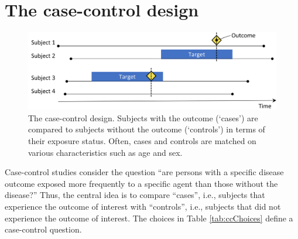 \documentclass[11pt]{book}
\theoremstyle{definition}
\theoremstyle{definition}
\theoremstyle{definition}
\theoremstyle{remark}
\begin{document}
\hypertarget{the-case-control-design}{%
\section{The case-control design}\label{the-case-control-design}}

\begin{figure}

{\centering \includegraphics[width=0.9\linewidth]{images/PopulationLevelEstimation/caseControl} 

}

\caption{The case-control design. Subjects with the outcome (‘cases’) are compared to subjects without the outcome (‘controls’) in terms of their exposure status. Often, cases and controls are matched on various characteristics such as age and sex.}\label{fig:caseControl}
\end{figure}

Case-control studies \citep{vandenbroucke_2012} consider the question ``are persons with a specific disease outcome exposed more frequently to a specific agent than those without the disease?'' Thus, the central idea is to compare ``cases'', i.e., subjects that experience the outcome of interest with ``controls'', i.e., subjects that did not experience the outcome of interest. The choices in Table \ref{tab:ccChoices} define a case-control question.
\end{document}

